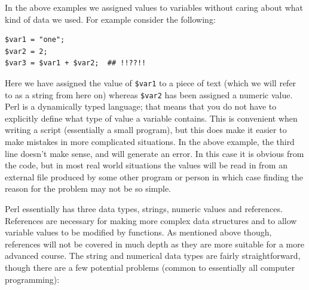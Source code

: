 \documentclass[11pt]{article}
\begin{document}
In the above examples we assigned values to variables without caring
about what kind of data we used. For example consider the following:

\begin{verbatim}
$var1 = "one";
$var2 = 2;
$var3 = $var1 + $var2;  ## !!??!!
\end{verbatim}

Here we have assigned the value of \texttt{\$var1} to a piece of text (which we
will refer to as a string from here on) whereas \texttt{\$var2} has been
assigned a numeric value. Perl is a dynamically typed language; that
means that you do not have to explicitly define what type of value a
variable contains. This is convenient when writing a script (essentially
a small program), but this does make it easier to make mistakes in more
complicated situations. In the above example, the third line doesn't
make sense, and will generate an error. In this case it is obvious from
the code, but in most real world situations the values will be read in
from an external file produced by some other program or person in which
case finding the reason for the problem may not be so simple.

Perl essentially has three data types, strings, numeric values and
references. References are necessary for making more complex data
structures and to allow variable values to be modified by functions. As
mentioned above though, references will not be covered in much depth as
they are more suitable for a more advanced course. The string and
numerical data types are fairly straightforward, though there are a few
potential problems (common to essentially all computer programming):
\end{document}
